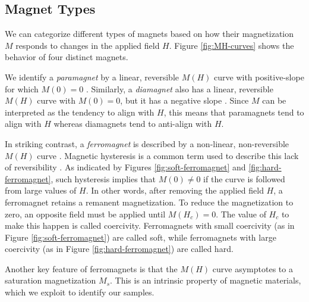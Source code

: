 \documentclass{../paper}
\begin{document}
\subsection{Magnet Types}

We can categorize different types of magnets based on how their magnetization $M$ responds to changes in the applied field $H$. Figure \ref{fig:MH-curves} shows the behavior of four distinct magnets.

We identify a {\em paramagnet} by a linear, reversible $M(H)$ curve with positive-slope for which $M(0) = 0$ \cite{QuantumDesign}. Similarly, a {\em diamagnet} also has a linear, reversible $M(H)$ curve with $M(0) = 0$, but it has a negative slope \cite{QuantumDesign}. Since $M$ can be interpreted as the tendency to align with $H$, this means that paramagnets tend to align with $H$ whereas diamagnets tend to anti-align with $H$.

In striking contrast, a {\em ferromagnet} is described by a non-linear, non-reversible $M(H)$ curve \cite{QuantumDesign}. Magnetic hysteresis is a common term used to describe this lack of reversibility \cite{QuantumDesign}. As indicated by Figures \ref{fig:soft-ferromagnet} and \ref{fig:hard-ferromagnet}, such hysteresis implies that $M(0) \neq 0$ if the curve is followed from large values of $H$. In other words, after removing the applied field $H$, a ferromagnet retains a remanent magnetization. To reduce the magnetization to zero, an opposite field must be applied until $M(H_c) = 0$. The value of $H_c$ to make this happen is called coercivity. Ferromagnets with small coercivity (as in Figure \ref{fig:soft-ferromagnet}) are called soft, while ferromagnets with large coercivity (as in Figure \ref{fig:hard-ferromagnet}) are called hard.

Another key feature of ferromagnets is that the $M(H)$ curve asymptotes to a saturation magnetization $M_s$. This is an intrinsic property of magnetic materials, which we exploit to identify our samples.
\end{document}

